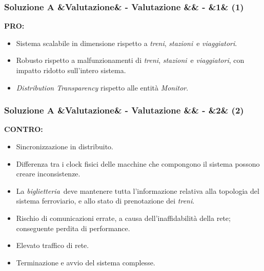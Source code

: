 \documentclass[slidestop,compress,blackandwhite]{beamer}
\newcommand{\ii}[1]{\textit{#1}}
\newcommand{\treni}{\ii{treni}}
\newcommand{\viaggiatori}{\ii{viaggiatori}}
\newcommand{\stazioni}{\ii{stazioni}}
\newcommand{\biglietteria}{\ii{biglietteria}}
\newcommand{\PRO}{\textbf{PRO:}}
\newcommand{\CONTRO}{\textbf{CONTRO:}}
\newcommand{\newtitle}[4]{
	#1 
	\ifx&#2&%
	\else
  		\large- #2
	\fi
	\ifx&#3&%
	\else
  		\normalsize- #3
	\fi
	\ifx&#4&%
	\else
  		\normalsize (#4)
	\fi
}
\newcommand{\newframe}[5]{
	\begin{frame}
		\frametitle{\newtitle{#1}{#2}{#3}{#4}}
		#5
	\end{frame}
}
\begin{document}
			
	
	\newframe{Soluzione A}{Valutazione}{}{1}{
		\PRO
			\begin{itemize}
				\item Sistema scalabile in dimensione rispetto a \treni, \stazioni~e \viaggiatori.
				\item Robusto rispetto a malfunzionamenti di \treni, \stazioni~e \viaggiatori, con impatto ridotto sull'intero sistema.
				\item \ii{Distribution Transparency} rispetto alle entità \ii{Monitor}.
			\end{itemize}
		
	}

	\newframe{Soluzione A}{Valutazione}{}{2}{
		\CONTRO
			\begin{itemize}
				\item Sincronizzazione in distribuito.
				\item Differenza tra i clock fisici delle macchine che compongono il sistema possono creare inconsistenze.
				\item La \biglietteria~deve mantenere tutta l'informazione relativa alla topologia del sistema ferroviario, e allo stato di prenotazione dei \treni.
				\item Rischio di comunicazioni errate, a causa dell'inaffidabilità della rete; conseguente perdita di performance. 
				\item Elevato traffico di rete.
				\item Terminazione e avvio del sistema complesse.
			\end{itemize}
	}
	
\end{document}
